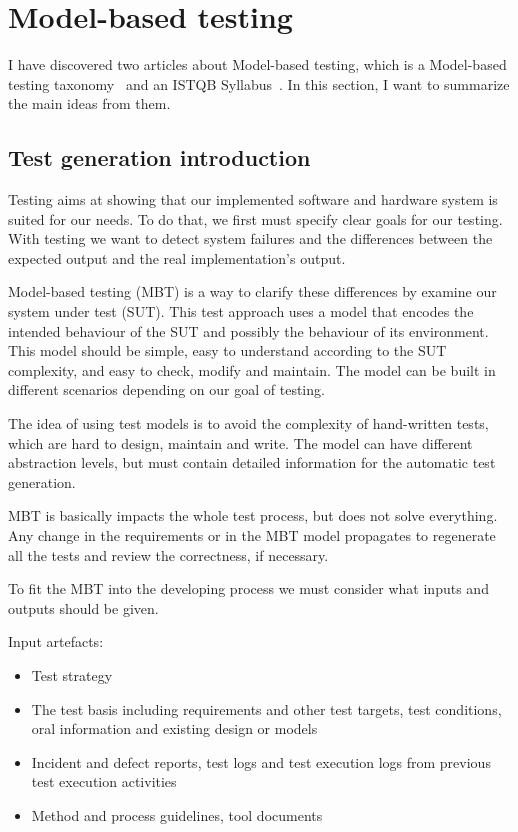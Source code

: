 \chapter{Model-based testing}
I have discovered two articles about Model-based testing, which is a Model-based testing taxonomy~\cite{Taxonomy} and an ISTQB Syllabus~\cite{Syllabus}. In this section, I want to summarize the main ideas from them.

\section{Test generation introduction}
Testing aims at showing that our implemented software and hardware system is suited for our needs. To do that, we first must specify clear goals for our testing. With testing we want to detect system failures and the differences between the expected output and the real implementation's output.

Model-based testing (MBT) is a way to clarify these differences by examine our system under test (SUT). This test approach uses a model that encodes the intended behaviour of the SUT and possibly the behaviour of its environment. This model should be simple, easy to understand according to the SUT complexity, and easy to check, modify and maintain. The model can be built in different scenarios depending on our goal of testing.

The idea of using test models is to avoid the complexity of hand-written tests, which are hard to design, maintain and write. The model can have different abstraction levels, but must contain detailed information for the automatic test generation.

MBT is basically impacts the whole test process, but does not solve everything. Any change in the requirements or in the MBT model propagates to regenerate all the tests and review the correctness, if necessary.

To fit the MBT into the developing process we must consider what inputs and outputs should be given.

Input artefacts:
\begin{itemize}
	\item Test strategy
	\item  The test basis including requirements and other test targets, test conditions, oral information and existing design or models
	\item  Incident and defect reports, test logs and test execution logs from previous test execution activities
	\item  Method and process guidelines, tool documents
\end{itemize}

